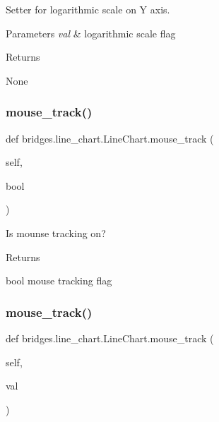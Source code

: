 Setter for logarithmic scale on Y axis. 


\begin{DoxyParams}{Parameters}
{\em val} & logarithmic scale flag \\
\hline
\end{DoxyParams}
\begin{DoxyReturn}{Returns}


None 
\end{DoxyReturn}
\mbox{\label{classbridges_1_1line__chart_1_1_line_chart_a363767606e7ea91f328aaaf78c6a7bb3}} 
\subsubsection{\texorpdfstring{mouse\+\_\+track()}{mouse\_track()}\hspace{0.1cm}{\footnotesize\ttfamily [1/2]}}
{\footnotesize\ttfamily def bridges.\+line\+\_\+chart.\+Line\+Chart.\+mouse\+\_\+track (\begin{DoxyParamCaption}\item[{}]{self,  }\item[{}]{bool }\end{DoxyParamCaption})}



Is mounse tracking on? 

\begin{DoxyReturn}{Returns}


bool mouse tracking flag 
\end{DoxyReturn}
\mbox{\label{classbridges_1_1line__chart_1_1_line_chart_a7dce5c3d15e13d1224c76551a4908adf}} 
\subsubsection{\texorpdfstring{mouse\+\_\+track()}{mouse\_track()}\hspace{0.1cm}{\footnotesize\ttfamily [2/2]}}
{\footnotesize\ttfamily def bridges.\+line\+\_\+chart.\+Line\+Chart.\+mouse\+\_\+track (\begin{DoxyParamCaption}\item[{}]{self,  }\item[{}]{val }\end{DoxyParamCaption})}



